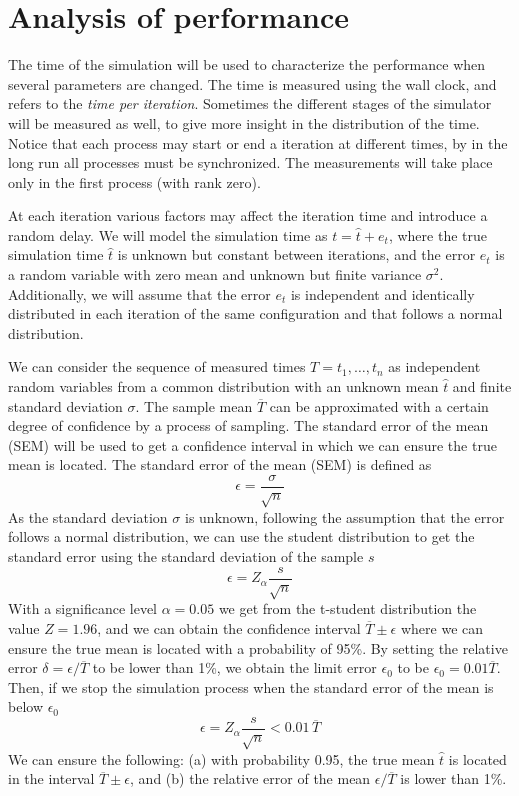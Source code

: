 \chapter{Analysis of performance}

The time of the simulation will be used to characterize the performance when 
several parameters are changed. The time is measured using the wall clock, and 
refers to the \textit{time per iteration}. Sometimes the different stages of the 
simulator will be measured as well, to give more insight in the distribution of 
the time. Notice that each process may start or end a iteration at different 
times, by in the long run all processes must be synchronized. The measurements 
will take place only in the first process (with rank zero).

At each iteration various factors may affect the iteration time and introduce a 
random delay. We will model the simulation time as $t = \hat t + e_t$, where the 
true simulation time $\hat t$ is unknown but constant between iterations, and 
the error $e_t$ is a random variable with zero mean and unknown but finite 
variance $\sigma^2$.  Additionally, we will assume that the error $e_t$ is 
independent and identically distributed in each iteration of the same 
configuration and that follows a normal distribution.

We can consider the sequence of measured times $T = t_1,\ldots,t_n$ as 
independent random variables from a common distribution with an unknown mean 
$\hat t$ and finite standard deviation $\sigma$. The sample mean $\overline T$ 
can be approximated with a certain degree of confidence by a process of 
sampling. The standard error of the mean (SEM) will be used to get a confidence 
interval in which we can ensure the true mean is located. The standard error of 
the mean (SEM) is defined as
%
\begin{equation}
\epsilon = \frac{\sigma}{\sqrt{n}}
\end{equation}
%
As the standard deviation $\sigma$ is unknown, following the assumption that the 
error follows a normal distribution, we can use the student distribution to get 
the standard error using the standard deviation of the sample $s$
%
\begin{equation}
\epsilon = Z_\alpha\frac{s}{\sqrt{n}}
\end{equation}
%
With a significance level $\alpha=0.05$ we get from the t-student distribution 
the value $Z=1.96$, and we can obtain the confidence interval $\overline T \pm 
\epsilon$ where we can ensure the true mean is located with a probability of 
95\%. By setting the relative error $\delta = \epsilon / \overline T$ to be 
lower than 1\%, we obtain the limit error $\epsilon_0$ to be $\epsilon_0 = 0.01 
\overline T$.
%
Then, if we stop the simulation process when the standard error of the mean is 
below $\epsilon_0$
%
\begin{equation}
\epsilon = Z_\alpha\frac{s}{\sqrt{n}} < 0.01 \, \overline T
\end{equation}
%
We can ensure the following: (a) with probability 0.95, the true mean $\hat t$ 
is located in the interval $\overline T \pm \epsilon$, and (b) the relative 
error of the mean $\epsilon/\overline T$ is lower than 1\%.

